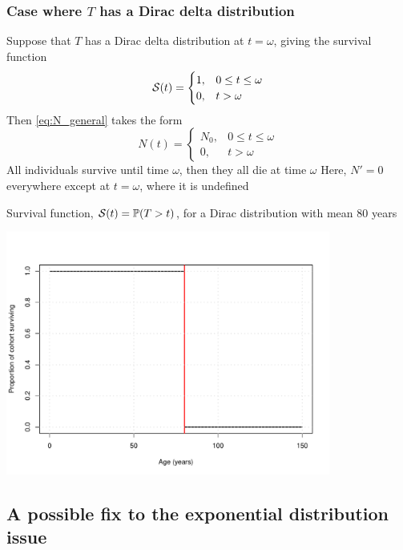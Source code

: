 \documentclass[aspectratio=169]{beamer}\usepackage[]{graphicx}\usepackage[]{xcolor}
\begin{document}
\begin{frame}\frametitle{Case where $T$ has a Dirac delta distribution}
Suppose that $T$ has a Dirac delta distribution at $t=\omega$, giving the
survival function 
\[
\S(t)=\begin{cases}
1, & 0\leq t\leq\omega \\
0, & t>\omega 
\end{cases}
\]
Then \eqref{eq:N_general} takes the form
\begin{equation}\label{eq:N2}
N(t)=\begin{cases}
N_0, & 0\leq t\leq\omega \\
0, & t>\omega
\end{cases}
\end{equation}
All individuals survive until time $\omega$, then they all die at time $\omega$
\vfill
Here, $N'=0$ everywhere except at $t=\omega$, where it is undefined
\end{frame}




\begin{frame}
Survival function, $\S(t)=\IP(T>t)$, for a Dirac distribution with mean 80 years
\begin{center}
\includegraphics[width=0.8\textwidth]{FIGS/L23-prop_surviving_dirac_80years-1.pdf}
\end{center}
\end{frame}




\subsection{A possible fix to the exponential distribution issue} 
\end{document}
